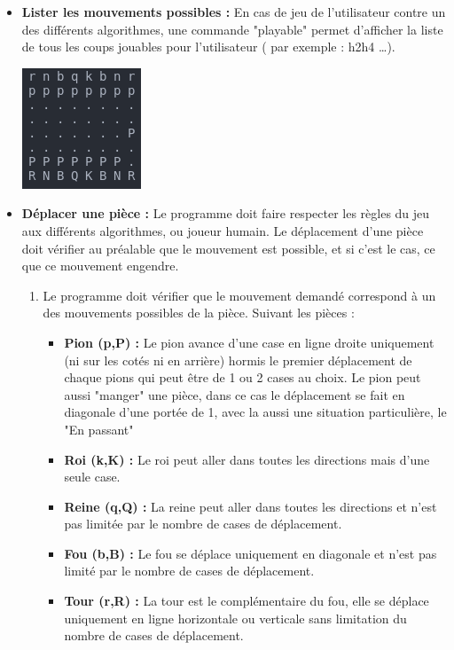 \documentclass{article}
\begin{document}
\begin{itemize}
    \medskip
    \item \textbf{Lister les mouvements possibles : }
    \newline
    En cas de jeu de l'utilisateur contre un des différents algorithmes, une commande "playable" permet d'afficher la liste de tous les coups jouables pour l'utilisateur ( par exemple : h2h4 \dots).
    \newline
    \centerline{\includegraphics[scale = 0.5]{img/chess_moveh2h4.png}}
    \medskip
    \item \textbf{Déplacer une pièce : }
    \newline
    Le programme doit faire respecter les règles du jeu aux différents algorithmes, ou joueur humain.
    Le déplacement d'une pièce doit vérifier au préalable que le mouvement est possible, et si c'est le cas, ce que ce mouvement engendre.
    \begin{enumerate}
        \item Le programme doit vérifier que le mouvement demandé correspond à un des mouvements possibles de la pièce.
        Suivant les pièces : 
        \begin{itemize}
            \item \textbf{Pion (p,P) : } Le pion avance d'une case en ligne droite uniquement (ni sur les cotés ni en arrière) hormis le premier déplacement de chaque pions qui peut être de 1 ou 2 cases au choix.
            Le pion peut aussi "manger" une pièce, dans ce cas le déplacement se fait en diagonale d'une portée de 1, avec la aussi une situation particulière, le "En passant"
            \item \textbf{Roi (k,K) : } Le roi peut aller dans toutes les directions mais d'une seule case.
            \item \textbf{Reine (q,Q) : } La reine peut aller dans toutes les directions et n'est pas limitée par le nombre de cases de déplacement.
            \item \textbf{Fou (b,B) : } Le fou se déplace uniquement en diagonale et n'est pas limité par le nombre de cases de déplacement.
            \item \textbf{Tour (r,R) : } La tour est le complémentaire du fou, elle se déplace uniquement en ligne horizontale ou verticale sans limitation du nombre de cases de déplacement.

\end{itemize}
\end{enumerate}
\end{itemize}
\end{document}
